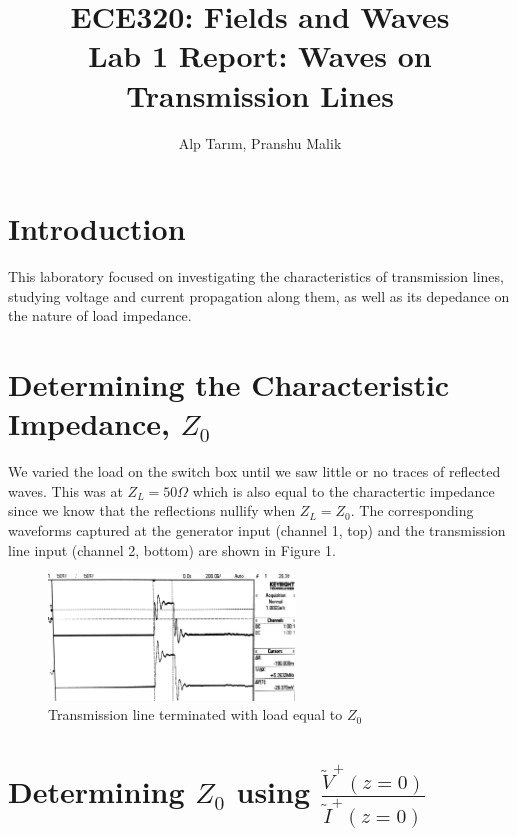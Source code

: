 \documentclass[10pt]{article}
\begin{document}
\title{\textbf{\Large{\textsc{ECE320:} Fields and Waves}} \\ \Large{Lab 1 Report: Waves on Transmission Lines}}
\author{Alp Tarım, Pranshu Malik}

\maketitle

\section{Introduction}

This laboratory focused on investigating the characteristics of transmission lines, studying voltage and current 
propagation along them, as well as its depedance on the nature of load impedance.


\section[Determining the Characteristic Impedance, Z0]{Determining the Characteristic Impedance, {$Z_0$}}

We varied the load on the switch box until we saw little or no traces of reflected waves.
This was at $Z_L = 50 \Omega$ which is also equal to the charactertic impedance 
since we know that the reflections nullify when $Z_L = Z_0$. The corresponding waveforms
captured at the generator input (channel 1, top) and the transmission line input (channel 2, bottom) 
are shown in Figure 1.

\begin{figure}[h]
    \centering
    \includegraphics[width=6.54cm]{../photos/lab1/load_matched.jpg}
    \caption{Transmission line terminated with load equal to $Z_0$}
    \label{tline_matching_z_0}
\end{figure}


\section[Determining Z0 using V/I]{Determining $Z_0$ using $\frac{\tilde V^+(z=0)}{\tilde I^+(z=0)}$}
\end{document}
